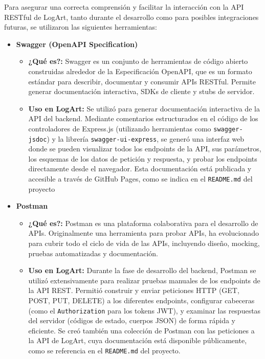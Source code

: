 Para asegurar una correcta comprensión y facilitar la interacción con la API RESTful de LogArt, tanto durante el desarrollo como para posibles integraciones futuras, se utilizaron las siguientes herramientas:

    \begin{itemize}
        \item \textbf{Swagger (OpenAPI Specification)}
            \begin{itemize}
                \item \textbf{¿Qué es?:} Swagger es un conjunto de herramientas de código abierto construidas alrededor de la Especificación OpenAPI, que es un formato estándar para describir, documentar y consumir APIs RESTful. Permite generar documentación interactiva, SDKs de cliente y stubs de servidor. \cite{kabartoloSwaggerJSDocExpress}
                \item \textbf{Uso en LogArt:} Se utilizó para generar documentación interactiva de la API del backend. Mediante comentarios estructurados en el código de los controladores de Express.js (utilizando herramientas como \texttt{swagger-jsdoc}) y la librería \texttt{swagger-ui-express}, se generó una interfaz web donde se pueden visualizar todos los endpoints de la API, sus parámetros, los esquemas de los datos de petición y respuesta, y probar los endpoints directamente desde el navegador. Esta documentación está publicada y accesible a través de GitHub Pages, como se indica en el \texttt{README.md} del proyecto
            \end{itemize}
            \vspace{0.3cm}

            \item \textbf{Postman}
                \begin{itemize}
                    \item \textbf{¿Qué es?:} Postman es una plataforma colaborativa para el desarrollo de APIs. Originalmente una herramienta para probar APIs, ha evolucionado para cubrir todo el ciclo de vida de las APIs, incluyendo diseño, mocking, pruebas automatizadas y documentación.
                    \item \textbf{Uso en LogArt:} Durante la fase de desarrollo del backend, Postman se utilizó extensivamente para realizar pruebas manuales de los endpoints de la API REST. Permitió construir y enviar peticiones HTTP (GET, POST, PUT, DELETE) a los diferentes endpoints, configurar cabeceras (como 
 el \texttt{Authorization} para los tokens JWT), y examinar las respuestas del servidor (códigos de estado, cuerpos JSON) de forma rápida y eficiente. Se creó también una colección de Postman con las peticiones a la API de LogArt, cuya documentación está disponible públicamente, como se referencia en el \texttt{README.md} del proyecto.
                \end{itemize}
    \end{itemize}

